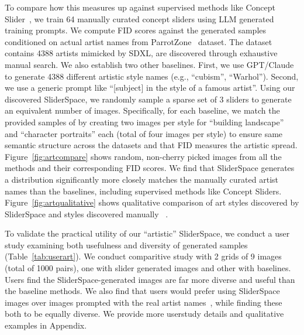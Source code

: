 To compare how this measures up against supervised methods like Concept Slider~\cite{gandikota2023concept}, we train 64 manually curated concept sliders using LLM generated training prompts. We compute FID scores against the generated samples conditioned on actual artist names from ParrotZone~\cite{parrotzone} dataset. The dataset contains 4388 artists mimicked by SDXL, are discovered through exhaustive manual search. We also establish two other baselines. First, we use GPT/Claude to generate 4388 different artistic style names (e.g., ``cubism'', ``Warhol''). Second, we use a generic prompt like ``[subject] in the style of a famous artist''. Using our discovered SliderSpace, we randomly sample a sparse set of 3 sliders to generate an equivalent number of images. Specifically, for each baseline, we match the provided samples of \cite{parrotzone} by creating two images per style for ``building landscape'' and ``character portraits'' each (total of four images per style) to ensure same semantic structure across the datasets and that FID measures the artistic spread. Figure~\ref{fig:artcompare} shows random, non-cherry picked images from all the methods and their corresponding FID scores. We find that SliderSpace generates a distribution significantly more closely matches the manually curated artist names than the baselines, including supervised methods like Concept Sliders. Figure~\ref{fig:artqualitative} shows qualitative comparison of art styles discovered by SliderSpace and styles discovered manually ~\cite{parrotzone}.




To validate the practical utility of our ``artistic'' SliderSpace, we conduct a user study examining both usefulness and diversity of generated samples (Table~\ref{tab:userart}). We conduct comparitive study with 2 grids of 9 images (total of 1000 pairs), one with slider generated images and other with baselines. Users find the SliderSpace-generated images are far more diverse and useful than the baseline methods. We also find that users would prefer using SliderSpace images over images prompted with the real artist names~\cite{parrotzone}, while finding these both to be equally diverse. We provide more userstudy details and qualitative examples in Appendix.




